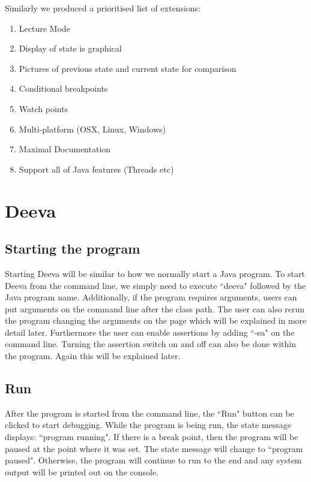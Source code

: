 \documentclass[11pt, a4paper]{article}
\begin{document}
Similarly we produced a prioritised list of extensions:

\begin{enumerate}
\item Lecture Mode
\item Display of state is graphical
\item Pictures of previous state and current state for comparison
\item Conditional breakpoints
\item Watch points
\item Multi-platform (OSX, Linux, Windows)
\item Maximal Documentation
\item Support all of Java features (Threads etc)
\end{enumerate}

\section{Deeva}
\subsection{Starting the program}
Starting Deeva will be similar to how we normally start a Java program.
To start Deeva from the command line, we simply need to execute ``deeva" followed by the Java program name.
Additionally, if the program requires arguments, users can put arguments on the command line after the class path.
The user can also rerun the program changing the arguments on the page which will be explained in more detail later.
Furthermore the user can enable assertions by adding ``-ea" on the command line. 
Turning the assertion switch on and off can also be done within the program. 
Again this will be explained later.

\subsection{Run}
After the program is started from the command line, the ``Run" button can be clicked to start debugging.
While the program is being run, the state message displays: ``program running".
If there is a break point, then the program will be paused at the point where it was set.
The state message will change to ``program paused".
Otherwise, the program will continue to run to the end and any system output will be printed out on the console.
\end{document}
